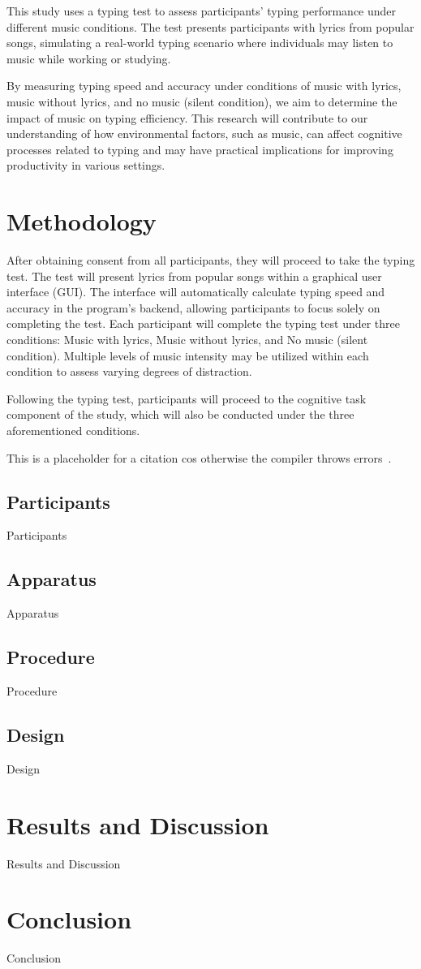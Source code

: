 \documentclass[manuscript, screen]{acmart} %
\begin{document}
This study uses a typing test to assess participants' typing performance under different music conditions. The test presents participants with lyrics from popular songs, simulating a real-world typing scenario where individuals may listen to music while working or studying.

By measuring typing speed and accuracy under conditions of music with lyrics, music without lyrics, and no music (silent condition), we aim to determine the impact of music on typing efficiency. This research will contribute to our understanding of how environmental factors, such as music, can affect cognitive processes related to typing and may have practical implications for improving productivity in various settings.

\section{Methodology}
After obtaining consent from all participants, they will proceed to take the typing test. The test will present lyrics from popular songs within a graphical user interface (GUI). The interface will automatically calculate typing speed and accuracy in the program's backend, allowing participants to focus solely on completing the test. Each participant will complete the typing test under three conditions: Music with lyrics, Music without lyrics, and No music (silent condition).
Multiple levels of music intensity may be utilized within each condition to assess varying degrees of distraction.

Following the typing test, participants will proceed to the cognitive task component of the study, which will also be conducted under the three aforementioned conditions. %

This is a placeholder for a citation cos otherwise the compiler throws errors~\cite{AudioDistractionsAshley}.

\subsection[short]{Participants}
Participants

\subsection[short]{Apparatus}
Apparatus

\subsection[short]{Procedure}
Procedure

\subsection[short]{Design}
Design

\section{Results and Discussion}
Results and Discussion

\section{Conclusion}
Conclusion




\end{document}

